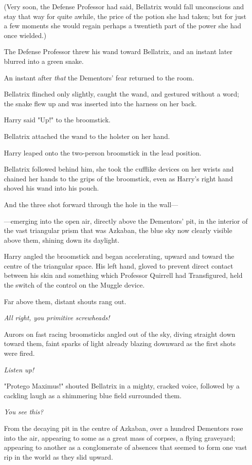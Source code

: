 (Very soon, the Defense Professor had said, Bellatrix would fall unconscious
and stay that way for quite awhile, the price of the potion she had taken; but
for just a few moments she would regain perhaps a twentieth part of the power
she had once wielded.)

The Defense Professor threw his wand toward Bellatrix, and an instant later
blurred into a green snake.

An instant after \emph{that} the Dementors' fear returned to the room.

Bellatrix flinched only slightly, caught the wand, and gestured without a word;
the snake flew up and was inserted into the harness on her back.

Harry said "Up!" to the broomstick.

Bellatrix attached the wand to the holster on her hand.

Harry leaped onto the two-person broomstick in the lead position.

Bellatrix followed behind him, she took the cufflike devices on her wrists and
chained her hands to the grips of the broomstick, even as Harry's right hand
shoved his wand into his pouch.

And the three shot forward through the hole in the wall---

---emerging into the open air, directly above the Dementors' pit, in the
interior of the vast triangular prism that was Azkaban, the blue sky now
clearly visible above them, shining down its daylight.

Harry angled the broomstick and began accelerating, upward and toward the
centre of the triangular space. His left hand, gloved to prevent direct contact
between his skin and something which Professor Quirrell had Transfigured, held
the switch of the control on the Muggle device.

Far above them, distant shouts rang out.

\emph{All right, you primitive screwheads!}

Aurors on fast racing broomsticks angled out of the sky, diving straight down
toward them, faint sparks of light already blazing downward as the first shots
were fired.

\emph{Listen up!}

"Protego Maximus!" shouted Bellatrix in a mighty, cracked voice, followed by a
cackling laugh as a shimmering blue field surrounded them.

\emph{You see this?}

From the decaying pit in the centre of Azkaban, over a hundred Dementors rose
into the air, appearing to some as a great mass of corpses, a flying graveyard;
appearing to another as a conglomerate of absences that seemed to form one vast
rip in the world as they slid upward.

